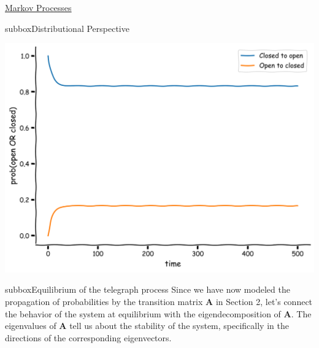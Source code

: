 \begin{textbox}{\href{https://colab.research.google.com/github/NeuromatchAcademy/course-content/blob/master/tutorials/W2D2_LinearSystems/student/W2D2_Tutorial2.ipynb}{Markov Processes } }
\begin{subbox}{subbox}{Distributional Perspective}
\begin{center}
\includegraphics[scale=0.1]{Figures/LS/MC_Figure5.png}
\end{center}

\end{subbox}
\begin{subbox}{subbox}{Equilibrium of the telegraph process}
\scriptsize
Since we have now modeled the propagation of probabilities by the transition matrix $\mathbf{A}$ in Section 2, let's connect the behavior of the system at equilibrium with the eigendecomposition of $\mathbf{A}$.
The eigenvalues of $\mathbf{A}$ tell us about the stability of the system, specifically in the directions of the corresponding eigenvectors.

\end{subbox}
\end{textbox}

